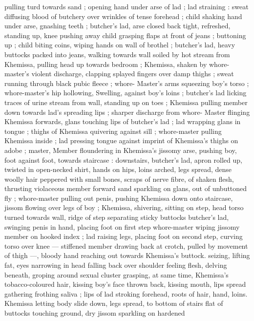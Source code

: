 {pulling turd towards sand ; opening hand under arse of lad ; lad 
straining : sweat diffusing blood of butchery over wrinkles of tense 
forehead ; child shaking hand under arse, gnashing teeth ; butcher's 
lad, arse closed back tight, refreshed, standing up, knee pushing 
away child grasping flaps at front of jeans ; buttoning up ; child 
biting coins, wiping hands on wall of brothel ; butcher's lad, heavy 
buttocks packed into jeans, walking towards wall soiled by hot stream 
from Khemissa, pulling head up towards bedroom ; Khemissa, shaken 
by whore-master's violent discharge, clapping splayed fingers over 
damp thighs ; sweat running through black pubic fleece ; whore- 
Master's arms squeezing boy's torso ; whore-master's hip hollowing, 
Swelling, against boy's loins ; butcher's lad licking traces of urine 
stream from wall, standing up on toes ; Khemissa pulling member 
down towards lad's spreading lips ; sharper discharge from whore- 
Master flinging Khemissa forwards, glans touching lips of butcher's 
lad ; lad wrapping glans in tongue ; thighs of Khemissa quivering 
against sill ; whore-master pulling Khemissa inside ; lad pressing 
tongue against imprint of Khemissa's thighs on adobe ; master, 
Member floundering in Khemissa's jissomy arse, pushing boy, foot 
against foot, towards staircase : downstairs, butcher's lad, apron 
rolled up, twisted in open-necked shirt, hands on hips, loins arched, 
legs spread, dense woolly hair peppered with small bones, scraps of 
nerve fibre, of shaken flesh, thrusting violaceous member forward 
sand sparkling on glans, out of unbuttoned fly ; whore-master 
pulling out penis, pushing Khemissa down onto staircase, jissom 
flowing over legs of boy ; Khemissa, shivering, sitting on step, head 
torso turned towards wall, ridge of step separating sticky buttocks 
butcher's lad, swinging penis in hand, placing foot on first step 
whore-master wiping jissomy member on hooked index ; lad raising 
legs, placing foot on second step, curving torso over knee --- 
stiffened member drawing back at crotch, pulled by movement of 
thigh ---, bloody hand reaching out towards Khemissa's buttock. 
seizing, lifting fat, eyes narrowing in head falling back over shoulder 
feeling flesh, delving beneath, groping around sexual cluster 
grasping, at same time, Khemissa's tobacco-coloured hair, kissing 
boy's face thrown back, kissing mouth, lips spread gathering frothing 
saliva ; lips of lad stroking forehead, roots of hair, hand, loins. 
Khemissa letting body slide down, legs spread, to bottom of stairs 
flat of buttocks touching ground, dry jissom sparkling on hardened 
}
